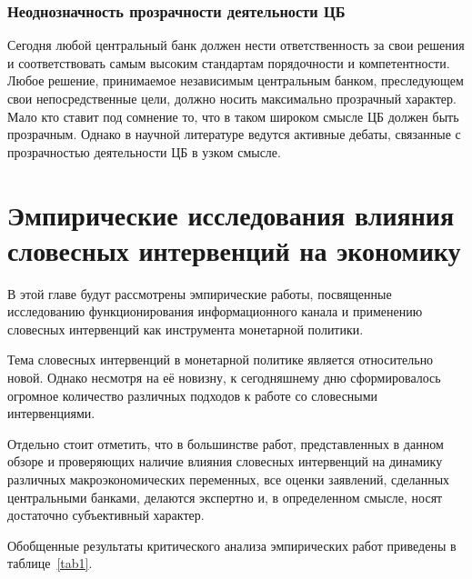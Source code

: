 \subsection{Неоднозначность прозрачности деятельности ЦБ}

Сегодня любой центральный банк должен нести ответственность за свои решения и соответствовать самым высоким стандартам порядочности и компетентности. Любое решение, принимаемое независимым центральным банком, преследующем свои непосредственные цели, должно носить максимально прозрачный характер. Мало кто ставит под сомнение то, что в таком широком смысле ЦБ должен быть прозрачным. Однако в научной литературе ведутся активные дебаты, связанные с прозрачностью деятельности ЦБ в узком смысле. 


\chapter{Эмпирические исследования влияния словесных интервенций на экономику}

В этой главе будут рассмотрены эмпирические работы, посвященные исследованию функционирования информационного канала и применению словесных интервенций как инструмента монетарной политики. 

Тема словесных интервенций в монетарной политике является относительно новой. Однако несмотря на её новизну, к сегодняшнему дню сформировалось огромное количество различных подходов к работе со словесными интервенциями.

Отдельно стоит отметить, что в большинстве работ, представленных в данном обзоре и  проверяющих наличие влияния словесных интервенций на динамику различных макроэкономических переменных, все оценки заявлений, сделанных центральными банками, делаются экспертно и, в определенном смысле, носят достаточно субъективный характер.

Обобщенные результаты критического анализа эмпирических работ приведены в таблице~\ref{tab1}.


